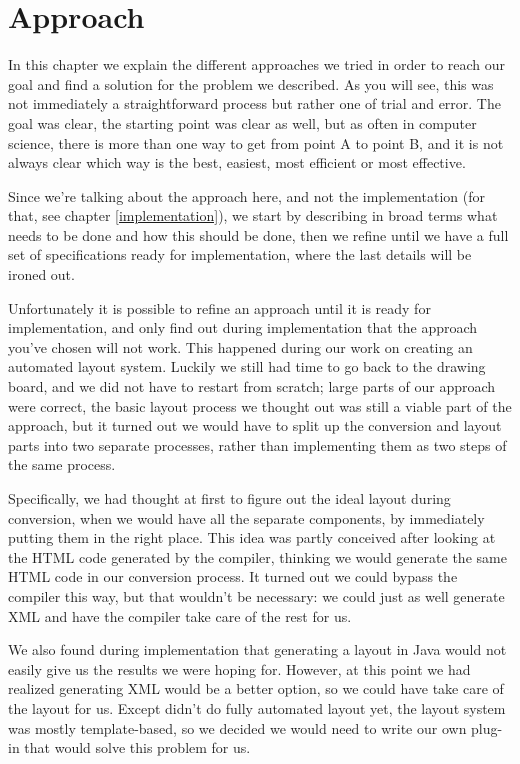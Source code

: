 
 \chapter{Approach}

  In this chapter we explain the different approaches we tried in order to
  reach our goal and find a solution for the problem we described. As you will
  see, this was not immediately a straightforward process but rather one of
  trial and error. The goal was clear, the starting point was clear as well,
  but as often in computer science, there is more than one way to get from
  point A to point B, and it is not always clear which way is the best,
  easiest, most efficient or most effective.
 
  Since we're talking about the approach here, and not the implementation (for
  that, see chapter \ref{implementation}), we start by describing in broad
  terms what needs to be done and how this should be done, then we refine until
  we have a full set of specifications ready for implementation, where the last
  details will be ironed out.

  Unfortunately it is possible to refine an approach until it is ready for
  implementation, and only find out during implementation that the approach
  you've chosen will not work. This happened during our work on creating an
  automated layout system. Luckily we still had time to go back to the drawing
  board, and we did not have to restart from scratch; large parts of our
  approach were correct, the basic layout process we thought out was still a
  viable part of the approach, but it turned out we would have to split up the
  conversion and layout parts into two separate processes, rather than
  implementing them as two steps of the same process.
  
  Specifically, we had thought at first to figure out the ideal layout during
  conversion, when we would have all the separate components, by immediately
  putting them in the right place. This idea was partly conceived after looking
  at the HTML code generated by the \mxp compiler, thinking we would generate
  the same HTML code in our conversion process. It turned out we could bypass
  the \mxp compiler this way, but that wouldn't be necessary: we could just as
  well generate \mxp XML and have the compiler take care of the rest for us.
 
  We also found during implementation that generating a layout in Java would
  not easily give us the results we were hoping for. However, at this point we
  had realized generating \mxp XML would be a better option, so we could have
  \mxp take care of the layout for us. Except \mxp didn't do fully automated
  layout yet, the layout system was mostly template-based, so we decided we
  would need to write our own \mxp plug-in that would solve this problem for
  us.

